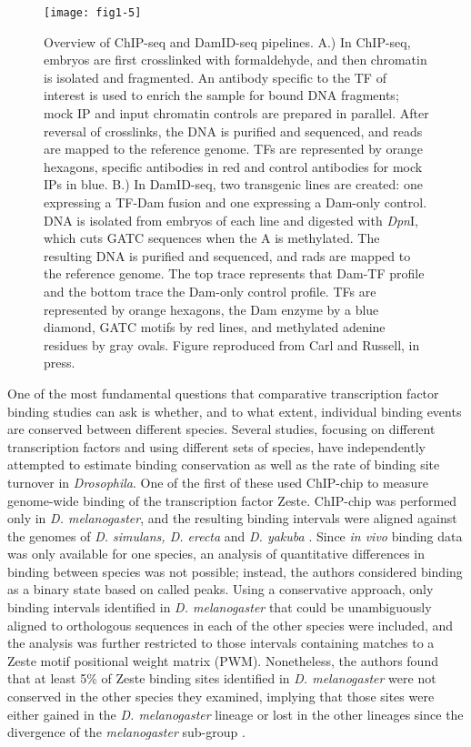 \begin{figure}
\centering
\texttt{[image: fig1-5]}
\caption{Overview of ChIP-seq and DamID-seq pipelines. A.) In ChIP-seq, embryos are first crosslinked with formaldehyde, and then chromatin is isolated and fragmented. An antibody specific to the TF of interest is used to enrich the sample for bound DNA fragments; mock IP and input chromatin controls are prepared in parallel. After reversal of crosslinks, the DNA is purified and sequenced, and reads are mapped to the reference genome. TFs are represented by orange hexagons, specific antibodies in red and control antibodies for mock IPs in blue. B.) In DamID-seq, two transgenic lines are created: one expressing a TF-Dam fusion and one expressing a Dam-only control. DNA is isolated from embryos of each line and digested with \emph{Dpn}I, which cuts GATC sequences when the A is methylated. The resulting DNA is purified and sequenced, and rads are mapped to the reference genome. The top trace represents that Dam-TF profile and the bottom trace the Dam-only control profile. TFs are represented by orange hexagons, the Dam enzyme by a blue diamond, GATC motifs by red lines, and methylated adenine residues by gray ovals. Figure reproduced from Carl and Russell, in press.}
\label{Figure 1.5}
\end{figure}

One of the most fundamental questions that comparative transcription factor binding studies can ask is whether, and to what extent, individual binding events are conserved between different species. Several studies, focusing on different transcription factors and using different sets of species, have independently attempted to estimate binding conservation as well as the rate of binding site turnover in \emph{Drosophila}. One of the first of these used ChIP-chip to measure genome-wide binding of the transcription factor Zeste. ChIP-chip was performed only in \emph{D. melanogaster}, and the resulting binding intervals were aligned against the genomes of \emph{D. simulans, D. erecta} and \emph{D. yakuba} \citep{moses_large-scale_2006}. Since \emph{in vivo} binding data was only available for one species, an analysis of quantitative differences in binding between species was not possible; instead, the authors considered binding as a binary state based on called peaks. Using a conservative approach, only binding intervals identified in \emph{D. melanogaster} that could be unambiguously aligned to orthologous sequences in each of the other species were included, and the analysis was further restricted to those intervals containing matches to a Zeste motif positional weight matrix (PWM). Nonetheless, the authors found that at least 5\% of Zeste binding sites identified in \emph{D. melanogaster} were not conserved in the other species they examined, implying that those sites were either gained in the \emph{D. melanogaster} lineage or lost in the other lineages since the divergence of the \emph{melanogaster} sub-group \citep{moses_large-scale_2006}.\\

